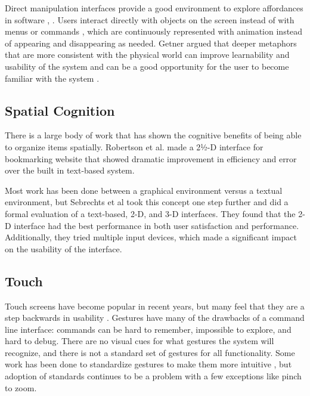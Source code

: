 \documentclass{article}
\begin{document}
Direct manipulation interfaces provide a good environment to explore affordances in software \cite{Gaver1991}, \cite{Norman1991}.  Users interact directly with objects on the screen instead of with menus or commands \cite{Hutchins1989} \cite{Shneiderman1992}, which are continuously represented with animation instead of appearing and disappearing as needed.\cite{Shneiderman1992}  Getner argued that deeper metaphors that are more consistent with the physical world can improve learnability and usability of the system \cite{Gentner1996} and can be a good opportunity for the user to become familiar with the system \cite{Fischer1994}.  


\subsection{Spatial Cognition}
There is a large body of work that has shown the cognitive benefits of being able to organize items spatially. \cite{Agarawala2006} \cite{Robertson1998} Robertson et al. made a 2½-D interface for bookmarking website that showed dramatic improvement in efficiency and error over the built in text-based system.  
	
	Most work has been done between a graphical environment versus a textual environment, but Sebrechts et al took this concept one step further and did a formal evaluation of a text-based, 2-D, and 3-D interfaces.\cite{Sebrechts1999}  They found that the 2-D interface had the best performance in both user satisfaction and performance.  Additionally, they tried multiple input devices, which made a significant impact on the usability of the interface. 

\subsection{Touch}
Touch screens have become popular in recent years, but many feel that they are a step backwards in usability \cite{Norman2010}.  Gestures have many of the drawbacks of a command line interface: commands can be hard to remember, impossible to explore, and hard to debug.  There are no visual cues for what gestures the system will recognize, and there is not a standard set of gestures for all functionality.   Some work has been done to standardize gestures to make them more intuitive \cite{North2009}, but adoption of standards continues to be a problem with a few exceptions like pinch to zoom.  
\end{document}
